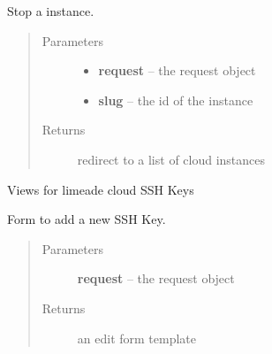 \documentclass[letterpaper,10pt,english]{sphinxmanual}
\begin{document}

\begin{fulllineitems}
\label{api/cloud:limeade.cloud.views.instance.instance_stop}
Stop a instance.
\begin{quote}\begin{description}
\item[{Parameters}] \leavevmode\begin{itemize}
\item {} 
\textbf{request} -- the request object

\item {} 
\textbf{slug} -- the id of the instance

\end{itemize}

\item[{Returns}] \leavevmode
redirect to a list of cloud instances

\end{description}\end{quote}

\end{fulllineitems}

\label{api/cloud:module-limeade.cloud.views.ssh}
Views for limeade cloud SSH Keys

\begin{fulllineitems}
\label{api/cloud:limeade.cloud.views.ssh.sshkey_add}
Form to add a new SSH Key.
\begin{quote}\begin{description}
\item[{Parameters}] \leavevmode
\textbf{request} -- the request object

\item[{Returns}] \leavevmode
an edit form template

\end{description}\end{quote}

\end{fulllineitems}

\end{document}
